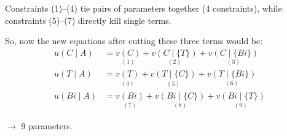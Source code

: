 Constraints (1)--(4) tie pairs of parameters together (4 constraints),
while constraints (5)--(7) directly kill single terms.

So, now the new equations after cutting these three terms would be:
\begin{align*}
    u(C \mid A) &= \underset{(1)}{v(C)} + \underset{(2)}{v(C \mid \{T\})} + \underset{(3)}{v(C \mid \{Bi\})} \\
    u(T \mid A) &= \underset{(4)}{v(T)} + \underset{(5)}{v(T \mid \{C\})} + \underset{(6)}{v(T \mid \{Bi\})} \\
    u(Bi \mid A) &= \underset{(7)}{v(Bi)} + \underset{(8)}{v(Bi \mid \{C\})} + \underset{(9)}{v(Bi \mid \{T\})}
\end{align*}

$\rightarrow$ 9 parameters.


